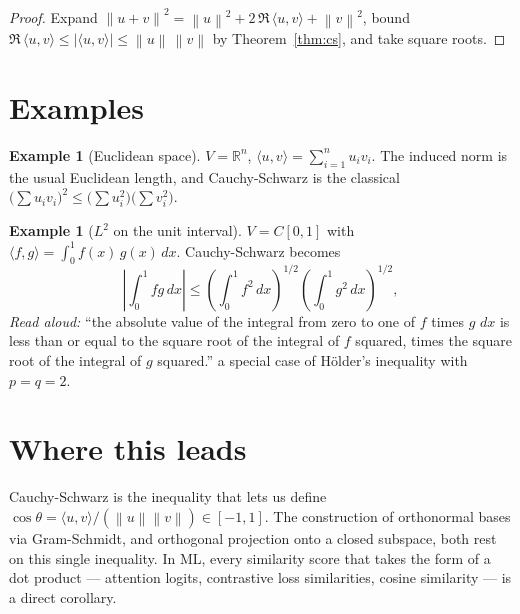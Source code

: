 \documentclass[11pt]{article}
\theoremstyle{definition}
\newtheorem{example}[theorem]{Example}
\newcommand{\inner}[2]{\langle #1, #2 \rangle}
\newcommand{\norm}[1]{\left\| #1 \right\|}
\newcommand{\R}{\mathbb{R}}
\begin{document}
\begin{proof}
Expand $\norm{u+v}^2 = \norm{u}^2 + 2\,\Re\,\inner{u}{v} + \norm{v}^2$,
bound $\Re\,\inner{u}{v} \le |\inner{u}{v}| \le \norm{u}\,\norm{v}$ by
Theorem~\ref{thm:cs}, and take square roots.
\end{proof}

\section{Examples}

\begin{example}[Euclidean space]
$V = \R^n$, $\inner{u}{v} = \sum_{i=1}^n u_i v_i$. The induced norm is
the usual Euclidean length, and Cauchy-Schwarz is the classical
$\bigl(\sum u_i v_i\bigr)^2 \le \bigl(\sum u_i^2\bigr)\bigl(\sum v_i^2\bigr)$.
\end{example}

\begin{example}[$L^2$ on the unit interval]
$V = C[0,1]$ with $\inner{f}{g} = \int_0^1 f(x)\,g(x)\,dx$. Cauchy-Schwarz
becomes
$$\left|\int_0^1 f g\,dx\right|
   \le \left(\int_0^1 f^2\,dx\right)^{1/2}
       \left(\int_0^1 g^2\,dx\right)^{1/2},$$
\emph{Read aloud:} ``the absolute value of the integral from zero to one of $f$ times $g$ $dx$ is less than or equal to the square root of the integral of $f$ squared, times the square root of the integral of $g$ squared.''
a special case of H\"older's inequality with $p = q = 2$.
\end{example}

\section{Where this leads}

Cauchy-Schwarz is the inequality that lets us define $\cos\theta =
\inner{u}{v}/(\norm{u}\norm{v}) \in [-1, 1]$. The construction of
orthonormal bases via Gram-Schmidt, and orthogonal projection onto a
closed subspace, both rest on this single inequality. In ML, every
similarity score that takes the form of a dot product --- attention
logits, contrastive loss similarities, cosine similarity --- is a
direct corollary.
\end{document}

